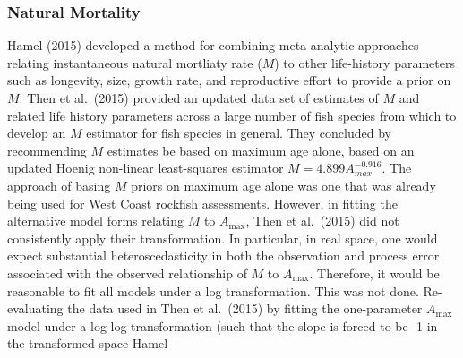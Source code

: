 \documentclass[11pt,
  english,
  a4paper,
]{article}
\begin{document}
\hypertarget{natural-mortality}{%
\subsubsection{Natural Mortality}\label{natural-mortality}}

\leavevmode\tagmcend\tagstructend


Hamel {(2015)\leavevmode\tagmcend\tagstructend} developed a method for combining meta-analytic approaches relating instantaneous natural mortliaty rate ({\(M\)\leavevmode\tagmcend\tagstructend}) to other life-history parameters such as longevity, size, growth rate, and reproductive effort to provide a prior on {\(M\)\leavevmode\tagmcend\tagstructend}. Then et al.~{(2015)\leavevmode\tagmcend\tagstructend} provided an updated data set of estimates of {\(M\)\leavevmode\tagmcend\tagstructend} and related life history parameters across a large number of fish species from which to develop an {\(M\)\leavevmode\tagmcend\tagstructend} estimator for fish species in general. They concluded by recommending {\(M\)\leavevmode\tagmcend\tagstructend} estimates be based on maximum age alone, based on an updated Hoenig non-linear least-squares estimator {\(M=4.899A^{-0.916}_{max}\)\leavevmode\tagmcend\tagstructend}. The approach of basing {\(M\)\leavevmode\tagmcend\tagstructend} priors on maximum age alone was one that was already being used for West Coast rockfish assessments. However, in fitting the alternative model forms relating {\(M\)\leavevmode\tagmcend\tagstructend} to {\(A_{\text{max}}\)\leavevmode\tagmcend\tagstructend}, Then et al.~{(2015)\leavevmode\tagmcend\tagstructend} did not consistently apply their transformation. In particular, in real space, one would expect substantial heteroscedasticity in both the observation and process error associated with the observed relationship of {\(M\)\leavevmode\tagmcend\tagstructend} to {\(A_{\text{max}}\)\leavevmode\tagmcend\tagstructend}. Therefore, it would be reasonable to fit all models under a log transformation. This was not done. Re-evaluating the data used in Then et al.~{(2015)\leavevmode\tagmcend\tagstructend} by fitting the one-parameter {\(A_{\text{max}}\)\leavevmode\tagmcend\tagstructend} model under a log-log transformation (such that the slope is forced to be -1 in the transformed space Hamel 
\end{document}
